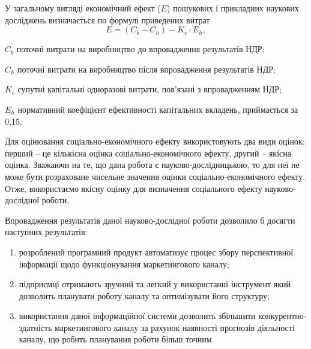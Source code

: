 У загальному вигляді економічний ефект ($E$) пошукових і прикладних наукових досліджень визначається по формулі приведених витрат
\begin{equation}
E = (C_b - C_h) - K_c   \cdot   E_h, \nonumber
\end{equation}

\begin{formulaDescription}
\item [$C_b$] поточні витрати на виробництво до впровадження результатів НДР;
\item [$C_h$] поточні витрати на виробництво після впровадження результатів НДР;
\item [$K_c$] супутні капітальні одноразові витрати, пов'язані з впровадженням НДР;
\item [$E_h$] нормативний коефіцієнт ефективності капітальних вкладень, приймається за 0,15.
\end{formulaDescription}

Для оцінювання соціально-економічного ефекту використовують два види оцінок: перший – це кількісна оцінка соціально-економічного ефекту, другий – якісна оцінка. Зважаючи на те, що дана робота є науково-дослідницькою, то для неї не може бути розраховане чисельне значення оцінки соціально-економічного ефекту. Отже, використаємо якісну оцінку для визначення соціального ефекту науково-дослідної роботи.

Впровадження результатів даної науково-дослідної роботи дозволило б досягти наступних результатів:
\begin{enumerate}
\item розроблений програмний продукт автоматизує процес збору перспективної інформації щодо функціонування маркетингового каналу;
\item підприємці отримають зручний та легкий у використанні інструмент який дозволить планувати роботу каналу та оптимізувати його структуру;
\item використання даної інформаційної системи дозволить збільшити конкурентно-здатність маркетингового каналу за рахунок наявності прогнозів діяльності каналу, що робить планування роботи більш точним.
\end{enumerate}
